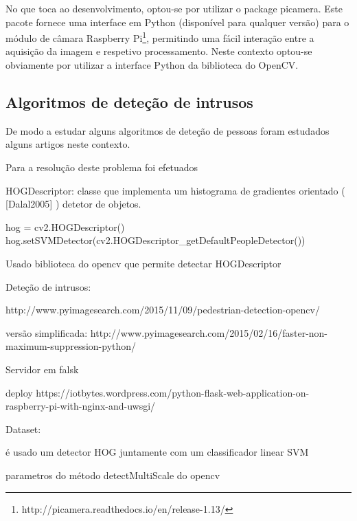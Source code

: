 No que toca ao desenvolvimento, optou-se por utilizar o package picamera. Este pacote fornece  uma interface em Python (disponível para qualquer versão) para o módulo de câmara Raspberry Pi\footnote{http://picamera.readthedocs.io/en/release-1.13/}, permitindo uma fácil interação entre a aquisição da imagem e respetivo processamento. Neste contexto optou-se obviamente por utilizar a interface Python da biblioteca do OpenCV.



\subsection{Algoritmos de deteção de intrusos}

De modo a estudar alguns algoritmos de deteção de pessoas foram estudados alguns artigos neste contexto. 


Para a resolução deste problema foi efetuados 


HOGDescriptor: classe que implementa um histograma de gradientes orientado ( [Dalal2005] ) detetor de objetos. 

hog = cv2.HOGDescriptor()
hog.setSVMDetector(cv2.HOGDescriptor\_getDefaultPeopleDetector())




Usado biblioteca do opencv que permite detectar 
HOGDescriptor


Deteção de intrusos: 

http://www.pyimagesearch.com/2015/11/09/pedestrian-detection-opencv/



versão simplificada: http://www.pyimagesearch.com/2015/02/16/faster-non-maximum-suppression-python/



Servidor em falsk 


deploy 
https://iotbytes.wordpress.com/python-flask-web-application-on-raspberry-pi-with-nginx-and-uwsgi/



Dataset: %


é usado um detector HOG juntamente com um classificador linear SVM 





parametros do método detectMultiScale do opencv 

